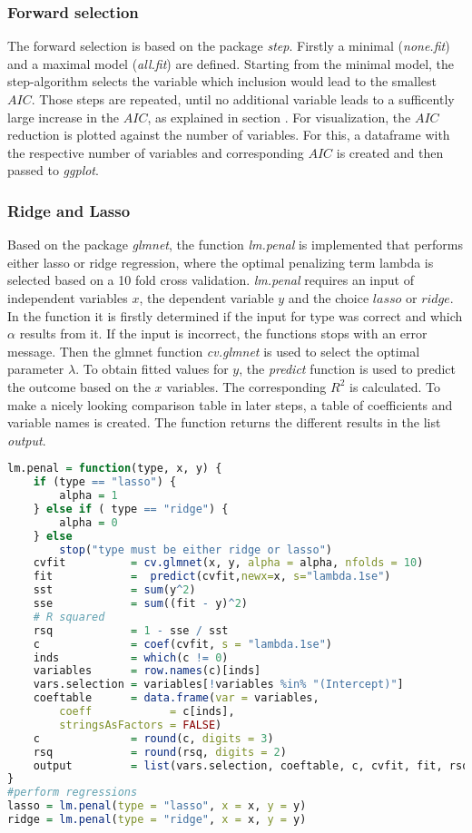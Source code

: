 \subsubsection{Forward selection}
The forward selection is based on the package \textit{step}. Firstly a minimal (\textit{none.fit}) and a maximal model (\textit{all.fit}) are defined. Starting from the minimal model, the step-algorithm selects the variable which inclusion would lead to the smallest $AIC$. Those steps are repeated, until no additional variable leads to a sufficently large increase in the $AIC$, as explained in section  . 
For visualization, the $AIC$ reduction is plotted against the number of variables. For this, a dataframe with the respective number of variables and corresponding $AIC$ is created and then passed to \textit{ggplot}.


\subsubsection{Ridge and Lasso}
Based on the package \textit{glmnet}, the function \textit{lm.penal} is implemented  that performs either lasso or ridge regression, where the optimal penalizing term lambda is selected based on a 10 fold cross validation. \textit{lm.penal} requires an input of independent variables $x$, the dependent variable $y$ and the choice $lasso$ or $ridge$. In the function it is firstly determined if the input for type was correct and which $\alpha$ results from it. If the input is incorrect, the functions stops with an error message.
Then the glmnet function \textit{cv.glmnet} is used to select the optimal parameter $\lambda$. To obtain fitted values for $y$,  the \textit{predict} function is used  to predict the outcome based on the $x$ variables. The corresponding $R^{2}$ is calculated.
To make a nicely looking comparison table in later steps, a table of coefficients and variable names is created. The function returns the different results in the list \textit{output}.
\begin{lstlisting}[language=R]
lm.penal = function(type, x, y) {
    if (type == "lasso") {
        alpha = 1
    } else if ( type == "ridge") {
        alpha = 0
    } else
        stop("type must be either ridge or lasso")
    cvfit          = cv.glmnet(x, y, alpha = alpha, nfolds = 10)
    fit            =  predict(cvfit,newx=x, s="lambda.1se")
    sst            = sum(y^2)
    sse            = sum((fit - y)^2)
    # R squared
    rsq            = 1 - sse / sst
    c              = coef(cvfit, s = "lambda.1se")
    inds           = which(c != 0)
    variables      = row.names(c)[inds]
    vars.selection = variables[!variables %in% "(Intercept)"]
    coeftable      = data.frame(var = variables,
        coeff            = c[inds],
        stringsAsFactors = FALSE)
    c              = round(c, digits = 3)
    rsq            = round(rsq, digits = 2)
    output         = list(vars.selection, coeftable, c, cvfit, fit, rsq)
}
#perform regressions
lasso = lm.penal(type = "lasso", x = x, y = y)
ridge = lm.penal(type = "ridge", x = x, y = y)
\end{lstlisting}


